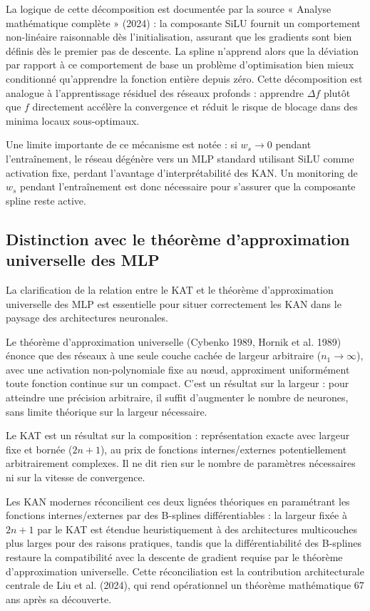 \documentclass[11pt,a4paper,oneside]{report}
\theoremstyle{definition}
\theoremstyle{remark}
\begin{document}
La logique de cette décomposition est documentée par la source « Analyse mathématique complète » (2024) : la composante SiLU fournit un comportement non-linéaire raisonnable dès l'initialisation, assurant que les gradients sont bien définis dès le premier pas de descente. La spline n'apprend alors que la déviation par rapport à ce comportement de base  un problème d'optimisation bien mieux conditionné qu'apprendre la fonction entière depuis zéro. Cette décomposition est analogue à l'apprentissage résiduel des réseaux profonds : apprendre $\Delta f$ plutôt que $f$ directement accélère la convergence et réduit le risque de blocage dans des minima locaux sous-optimaux.

Une limite importante de ce mécanisme est notée : si $w_s \rightarrow 0$ pendant l'entraînement, le réseau dégénère vers un MLP standard utilisant SiLU comme activation fixe, perdant l'avantage d'interprétabilité des KAN. Un monitoring de $w_s$ pendant l'entraînement est donc nécessaire pour s'assurer que la composante spline reste active.

\subsection{Distinction avec le théorème d'approximation universelle des MLP}

La clarification de la relation entre le KAT et le théorème d'approximation universelle des MLP est essentielle pour situer correctement les KAN dans le paysage des architectures neuronales.

Le théorème d'approximation universelle (Cybenko 1989, Hornik et al. 1989) énonce que des réseaux à une seule couche cachée de largeur arbitraire ($n_1 \rightarrow \infty$), avec une activation non-polynomiale fixe au nœud, approximent uniformément toute fonction continue sur un compact. C'est un résultat sur la largeur : pour atteindre une précision arbitraire, il suffit d'augmenter le nombre de neurones, sans limite théorique sur la largeur nécessaire.

Le KAT est un résultat sur la composition : représentation exacte avec largeur fixe et bornée ($2n+1$), au prix de fonctions internes/externes potentiellement arbitrairement complexes. Il ne dit rien sur le nombre de paramètres nécessaires ni sur la vitesse de convergence.

Les KAN modernes réconcilient ces deux lignées théoriques en paramétrant les fonctions internes/externes par des B-splines différentiables : la largeur fixée à $2n+1$ par le KAT est étendue heuristiquement à des architectures multicouches plus larges pour des raisons pratiques, tandis que la différentiabilité des B-splines restaure la compatibilité avec la descente de gradient requise par le théorème d'approximation universelle. Cette réconciliation est la contribution architecturale centrale de Liu et al. (2024), qui rend opérationnel un théorème mathématique 67 ans après sa découverte.
\end{document}

